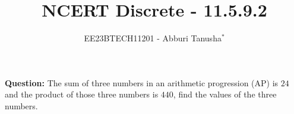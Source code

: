 \documentclass[journal,12pt,twocolumn]{IEEEtran}
\theoremstyle{remark}
\begin{document}

\vspace{3cm}

\title{NCERT Discrete - 11.5.9.2}
\author{EE23BTECH11201 - Abburi Tanusha$^{*}$%
}
\maketitle
\newpage
\bigskip

\renewcommand{\thefigure}{\theenumi}
\renewcommand{\thetable}{\theenumi}

\vspace{3cm}

\maketitle
\textbf{Question:} 
The sum of three numbers in an arithmetic progression (AP) is $24$ and the product of those three numbers is $440$, find the values of the three numbers.
\end{document}
